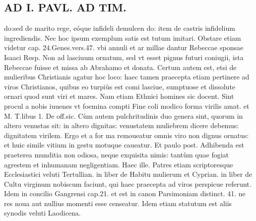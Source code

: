 \documentclass{article}
\begin{document}
\begin{pages}
\section*{AD I. PAVL. AD TIM. }
\marginpar{[ p.78 ]}\pstart do:sed de marito rege, eóque infideli demulcen do: item de castris infidelium ingrediendis. Nec hoc ipsum exemplum satis est tutum imitari. Obstare etiam videtur cap. 24.Genes.vers.47. vbi annuli et ar millae dantur Rebeccae sponsae Isaaci Resp. Non ad lasciuum ornatum, sed vt esset pignus futuri coniugii, ista Rebeccae fuisse et missa ab Abrahamo et donata.  \pend\pstart Certum autem est, etsi de mulieribus Christianis agatur hoc loco: haec tamen praecepta etiam pertinere ad viros Christianos, quibus eo turpiùs est comi lasciue, sumptuose et dissolute ornari quod sunt viri et mares. Nam etiam Ethnici homines sic docent.  \pend\pstart Sint procul a nobis iuuenes vt foemina compti Fine coli modico forma virilis amat. et M. T.libus 1. De off.sic. Cùm autem pulchritudinis duo genera sint, quorum in altero venustas sit: in altero dignitas: venustatem muliebrem dicere debemus: dignitatem virilem. Ergo et a for ma remoueatur omnis viro non dignus ornatus: et huic simile vitium in gestu motuque caueatur.  \pend\pstart Et paulo post. Adhibenda est praeterea munditia non odiosa, neque exquisita nimis: tantùm quae fogiat agrestem et inhumanam negligentiam. Haec ille. Patres etiam scriptoresque Ecclesiastici veluti Tertullian. in liber  de Habitu mulierum et Cyprian. in liber  de Cultu virginum nobiscum faciunt, qui haec praecepta ad viros perspicue referunt. Idem in concilio Gangrensi cap.21. et est in canon Parsimoniam distinct. 41. ne res noua aut nullius momenti esse censeatur. Idem etiam statutum est aliis synodis veluti Laodicena.  \pend

\end{pages}
\end{document}
